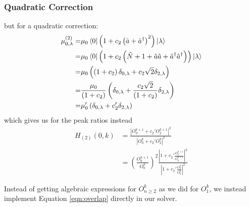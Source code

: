 \subsubsection{Quadratic Correction}
but for a quadratic correction:
\begin{align*}
	\mu^{(2)}_{0,\lambda} =& \mu_0 \bra{0} \left( 1 + c_2\left(\hat{a} + \hat{a}^{\dagger}\right)^2\right) \ket{\lambda}\\
	=& \mu_0 \bra{0} \left( 1 + c_2\left(\hat{N} + 1 + \hat{a}\hat{a} + \hat{a}^{\dagger}\hat{a}^{\dagger}\right)\right) \ket{\lambda}\\
	=& \mu_0 \left( \left(1 + c_2\right) \delta_{0,\lambda} + c_2\sqrt{2}\delta_{2,\lambda} \right) \\
	=& \frac{\mu_0}{\left(1 + c_2\right)} \left(  \delta_{0,\lambda} + \frac{c_2\sqrt{2}}{\left(1 + c_2\right)} \delta_{2,\lambda} \right) \\
	=& \mu_0' \left(  \delta_{0,\lambda} + c_2' \delta_{2,\lambda} \right)
\end{align*}
which gives us for the peak ratios instead
\begin{align}
	H_{(2)}(0,k) &= \frac{\left| O_{0}^{k+1} + c_2' O_{2}^{k+1}  \right|^2 }{\left|O_{0}^{k} +  c_2' O_{2}^{k} \right|^2} \\
	&=  \left(\frac{O_{0}^{k+1}}{O_{0}^{k}} \right)^2   \frac{ \left|1 + c_2'\frac{O_{2}^{k+1}}{O_{0}^{k+1}}  \right|^2}{\left|1 + c_2'\frac{O_{2}^{k} }{O_{0}^{k}}\right|^2}
\end{align}

Instead of getting algebraic expressions for $O_{n\geq2}^{k}$ as we did for $O_{1}^{k}$, we instead implement Equation \ref{eqn:overlap} directly in our solver.

